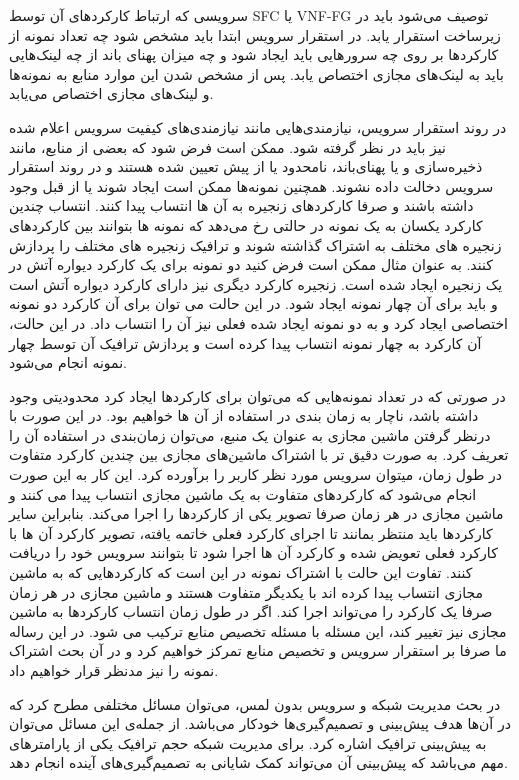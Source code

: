 سرویسی که ارتباط کارکردهای آن توسط SFC یا VNF-FG توصیف می‌شود باید در زیرساخت استقرار یابد.
در استقرار سرویس ابتدا باید مشخص شود چه تعداد نمونه از کارکردها بر روی چه سرورهایی باید ایجاد شود و چه میزان پهنای باند از چه لینک‌هایی باید به لینک‌های مجازی اختصاص یابد.
پس از مشخص شدن این موارد منابع به نمونه‌ها و لینک‌های مجازی اختصاص می‌یابد.

در روند استقرار سرویس، نیازمندی‌هایی مانند نیازمندی‌های کیفیت سرویس اعلام شده نیز باید در نظر گرفته شود.
ممکن است فرض شود که بعضی از منابع، مانند ذخیره‌سازی و یا پهنای‌باند، نامحدود یا از پیش تعیین شده هستند و در روند استقرار سرویس دخالت داده نشوند.
همچنین نمونه‌ها ممکن است ایجاد شوند یا از قبل وجود داشته باشند و صرفا کارکردهای زنجیره به آن ها انتساب پیدا کنند.
انتساب چندین کارکرد یکسان به یک نمونه در حالتی رخ می‌دهد که نمونه ها بتوانند بین کارکردهای زنجیره های مختلف به اشتراک گذاشته شوند و ترافیک زنجیره های مختلف را پردازش کنند.
به عنوان مثال ممکن است فرض کنید دو نمونه برای یک کارکرد دیواره آتش در یک زنجیره ایجاد شده است. زنجیره کارکرد دیگری نیز دارای کارکرد دیواره آتش است و باید برای آن چهار نمونه ایجاد شود.
در این حالت می توان برای آن کارکرد دو نمونه اختصاصی ایجاد کرد و به دو نمونه ایجاد شده فعلی نیز آن را انتساب داد.
در این حالت، آن کارکرد به چهار نمونه انتساب پیدا کرده است و پردازش ترافیک آن توسط چهار نمونه انجام می‌شود.

در صورتی که در تعداد نمونه‌هایی که می‌توان برای کارکردها ایجاد کرد محدودیتی وجود داشته باشد، ناچار به زمان بندی در استفاده از آن ها خواهیم بود.
در این صورت با درنظر گرفتن ماشین مجازی به عنوان یک منبع، می‌توان زمان‌بندی در استفاده آن را تعریف کرد.
به صورت دقیق تر با اشتراک ماشین‌های مجازی بین چندین کارکرد متفاوت در طول زمان، میتوان سرویس مورد نظر کاربر را برآورده کرد.
این کار به این صورت انجام می‌شود که کارکردهای متفاوت به یک ماشین مجازی انتساب پیدا می کنند و ماشین مجازی در هر زمان صرفا تصویر یکی از کارکردها را اجرا می‌کند.
بنابراین سایر کارکردها باید منتظر بمانند تا اجرای کارکرد فعلی خاتمه یافته، تصویر کارکرد آن ها با کارکرد فعلی تعویض شده و کارکرد آن ها اجرا شود تا بتوانند سرویس خود را دریافت کنند.
تفاوت این حالت با اشتراک نمونه در این است که کارکردهایی که به ماشین مجازی انتساب پیدا کرده اند با یکدیگر متفاوت هستند و ماشین مجازی در هر زمان صرفا یک کارکرد را می‌تواند اجرا کند.
اگر در طول زمان انتساب کارکردها به ماشین مجازی نیز تغییر کند، این مسئله با مسئله تخصیص منابع ترکیب می شود.
در این رساله ما صرفا بر استقرار سرویس و تخصیص منابع تمرکز خواهیم کرد و در آن بحث اشتراک نمونه را نیز مدنظر قرار خواهیم داد.

در بحث مدیریت شبکه و سرویس بدون لمس، می‌توان مسائل مختلفی مطرح کرد که در آن‌ها هدف پیش‌بینی و تصمیم‌گیری‌ها خودکار می‌باشد. از جمله‌ی این مسائل می‌توان به پیش‌بینی ترافیک اشاره کرد.
برای مدیریت شبکه حجم ترافیک یکی از پارامترهای مهم می‌باشد که پیش‌بینی آن می‌تواند کمک شایانی به تصمیم‌گیری‌های آینده انجام دهد.

